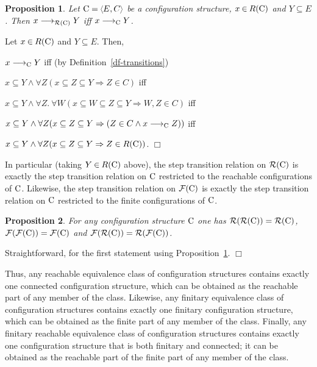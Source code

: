 \documentclass[twocolumn]{article}
\newtheorem{prop}{Proposition}[section]
\newenvironment{proposition}[1]{\begin{prop} \rm \label{pr-#1} }{\end{prop}}
\newenvironment{proof}{\begin{trivlist} \item[\hspace{\labelsep}\bf
Proof:]}{\hfill $\Box$\end{trivlist}}
\newcommand{\df}[1]{Definition~\ref{df-#1}}
\newcommand{\pr}[1]{Proposition~\ref{pr-#1}}
\begin{document}
\begin{proposition}{reachable transitions}
Let $\eC=\tuple{E,C}$ be a configuration structure, $x\mathbin\in
R({\rm C})$ and $Y\mathbin\subseteq E$.
Then $x \stackrel{}{\longrightarrow}_{{\cal R}({\rm C})} Y$ iff $x \stackrel{}{\longrightarrow}_{\rm C} Y$.
\end{proposition}
\begin{proof}
Let $x \mathbin\in R({\rm C})$ and $Y\mathbin\subseteq E$. Then,

$x \stackrel{}{\longrightarrow}_{\rm C} Y$ iff (by \df{transitions})

$x \subseteq Y \wedge \forall Z (x \subseteq Z
\subseteq Y \Rightarrow Z\in C)$ iff

$x \subseteq Y \wedge \forall Z.~\forall W (x \subseteq W \subseteq Z
\subseteq Y \Rightarrow W,Z \in C)$ iff

$x \subseteq Y \wedge \forall Z (x \subseteq Z
\subseteq Y \Rightarrow (Z\in C \wedge x \stackrel{}{\longrightarrow}_{\rm C} Z))$ iff

$x \subseteq Y \wedge \forall Z (x \subseteq Z
\subseteq Y \Rightarrow Z\in R({\rm C}))$.
\end{proof}
In particular (taking $Y\mathbin\in R({\rm C})$ above), the step
transition relation on ${\cal R}({\rm C})$ is exactly the step transition
relation on ${\rm C}$ restricted to the reachable configurations of ${\rm C}$.
Likewise, the step transition relation on ${\cal F}({\rm C})$ is exactly the
step transition relation on ${\rm C}$ restricted to the finite
configurations of ${\rm C}$.

\begin{proposition}{idempotence}
For any configuration structure ${\rm C}$ one has
${\cal R}({\cal R}({\rm C}))={\cal R}({\rm C})$,
${\cal F}({\cal F}({\rm C}))={\cal F}({\rm C})$ and
${\cal F}({\cal R}({\rm C}))={\cal R}({\cal F}({\rm C}))$.
\end{proposition}

\begin{proof}
Straightforward, for the first statement using \pr{reachable transitions}.
\end{proof}
Thus, any reachable equivalence class of configuration structures
contains exactly one connected configuration structure, which can be
obtained as the reachable part of any member of the class.
Likewise, any finitary equivalence class of configuration structures
contains exactly one finitary configuration structure, which can be
obtained as the finite part of any member of the class.
Finally, any finitary reachable equivalence class of configuration
structures contains exactly one configuration structure that is both
finitary and connected; it can be obtained as the reachable part of
the finite part of any member of the class.
\end{document}

